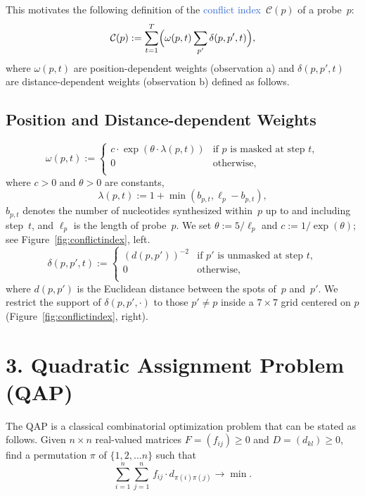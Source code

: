 \documentclass[portrait]{a0poster}
\newcommand{\myemph}[1]{\textcolor{highlight}{#1}}
\begin{document}
\begin{multicols}{3}[\aggiheader]
This motivates the following definition of the
\myemph{conflict index}~$\mathcal{C}(p)$ of a probe~$p$:
\[
\mathcal{C}(p) := \sum_{t=1}^{T} \Bigl( \omega(p,t) \sum_{p'} \delta(p,p',t) \Bigr),
\]
where $\omega(p,t)$ are position-dependent weights (observation a) and
$\delta(p,p',t)$ are distance-dependent weights (observation b) defined as
follows.


\subsection*{Position and Distance-dependent Weights}

\[
\omega(p,t) :=
\left\{
\begin{array}{ll}
c \cdot \exp{\left(\theta \cdot \lambda(p,t)\right)} & \mbox{if $p$ is masked at step $t$}, \\
0 & \mbox{otherwise}, \\
\end{array}
\right.
\]
where $c>0$ and $\theta>0$ are constants,
\[
\lambda(p,t) := 1 + \min(b_{p,t},\ell_{p} - b_{p,t}),
\]
$b_{p,t}$ denotes the number of nucleotides synthesized within~$p$ up to and
including step~$t$, and $\ell_{p}$ is the length of probe~$p$. We set
$\theta := 5/\ell_p$ and $c := 1/\exp(\theta)$; see
Figure~\ref{fig:conflictindex}, left.
\[
\delta(p,p',t) :=
\left\{
\begin{array}{ll}
(d(p,p'))^{-2} & \mbox{if $p'$ is unmasked at step $t$}, \\
             0 & \mbox{otherwise}, \\
\end{array}
\right.
\]
where $d(p,p')$ is the Euclidean distance between the spots of~$p$ and~$p'$.
We restrict the support of $\delta(p,p',\cdot)$ to those $p'\neq p$ inside
a $7\times 7$ grid centered on $p$ (Figure~\ref{fig:conflictindex}, right).

\section*{\textcolor{aggigreen}{3. Quadratic Assignment Problem (QAP)}}

The QAP is a classical combinatorial optimization problem that can be
stated as follows. Given $n \times n$ real-valued matrices $F = (f_{ij})\geq 0$ and $D = (d_{kl})\geq 0$, find a permutation $\pi$ of $\{1, 2, \ldots n\}$ such that
\[
  \sum_{i=1}^{n} \sum_{j=1}^{n}\,  f_{ij} \cdot d_{\pi(i)\pi(j)} \to \min.
\]


\end{multicols}
\end{document}

